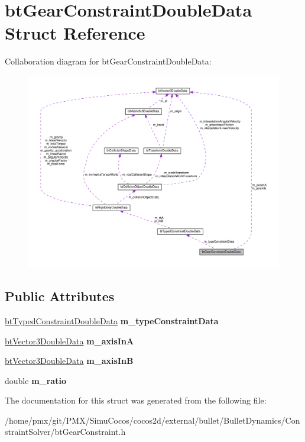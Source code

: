 \hypertarget{structbtGearConstraintDoubleData}{}\section{bt\+Gear\+Constraint\+Double\+Data Struct Reference}
\label{structbtGearConstraintDoubleData}


Collaboration diagram for bt\+Gear\+Constraint\+Double\+Data\+:
\nopagebreak
\begin{figure}[H]
\begin{center}
\leavevmode
\includegraphics[width=350pt]{structbtGearConstraintDoubleData__coll__graph}
\end{center}
\end{figure}
\subsection*{Public Attributes}
\begin{DoxyCompactItemize}
\item 
\mbox{\label{structbtGearConstraintDoubleData_a853abf6706c1bd322df0eb90d92ccc81}} 
\hyperlink{structbtTypedConstraintDoubleData}{bt\+Typed\+Constraint\+Double\+Data} {\bfseries m\+\_\+type\+Constraint\+Data}
\item 
\mbox{\label{structbtGearConstraintDoubleData_a6acca0dbc977abf767db86c817ae35f3}} 
\hyperlink{structbtVector3DoubleData}{bt\+Vector3\+Double\+Data} {\bfseries m\+\_\+axis\+InA}
\item 
\mbox{\label{structbtGearConstraintDoubleData_af833dc67a6b05f00014bb42d2b02099f}} 
\hyperlink{structbtVector3DoubleData}{bt\+Vector3\+Double\+Data} {\bfseries m\+\_\+axis\+InB}
\item 
\mbox{\label{structbtGearConstraintDoubleData_a090eaf866589dd6e9e960ce6b6b6ba13}} 
double {\bfseries m\+\_\+ratio}
\end{DoxyCompactItemize}


The documentation for this struct was generated from the following file\+:\begin{DoxyCompactItemize}
\item 
/home/pmx/git/\+P\+M\+X/\+Simu\+Cocos/cocos2d/external/bullet/\+Bullet\+Dynamics/\+Constraint\+Solver/bt\+Gear\+Constraint.\+h\end{DoxyCompactItemize}
